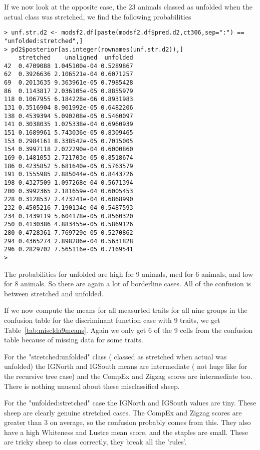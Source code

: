 \documentclass[titlepage]{article}  %
\begin{document}
If we now look at the opposite case, the 23 animals classed as unfolded when the actual class was stretched, we find the following probabilities
\begin{verbatim}
> unf.str.d2 <- modsf2.df[paste(modsf2.df$pred.d2,ct306,sep=":") == "unfolded:stretched",]
> pd2$posterior[as.integer(rownames(unf.str.d2)),]
    stretched    unaligned  unfolded
42  0.4709088 1.045100e-04 0.5289867
62  0.3926636 2.106521e-04 0.6071257
69  0.2013635 9.363961e-05 0.7985428
86  0.1143817 2.036105e-05 0.8855979
118 0.1067955 6.184228e-06 0.8931983
131 0.3516904 8.901992e-05 0.6482206
138 0.4539394 5.090208e-05 0.5460097
141 0.3038035 1.025338e-04 0.6960939
151 0.1689961 5.743036e-05 0.8309465
153 0.2984161 8.338542e-05 0.7015005
154 0.3997118 2.022290e-04 0.6000860
169 0.1481053 2.721703e-05 0.8518674
186 0.4235852 5.681640e-05 0.5763579
191 0.1555985 2.885044e-05 0.8443726
198 0.4327509 1.097268e-04 0.5671394
200 0.3992365 2.181659e-04 0.6005453
228 0.3128537 2.473241e-04 0.6868990
232 0.4505216 7.190134e-04 0.5487593
234 0.1439119 5.604178e-05 0.8560320
250 0.4130386 4.883455e-05 0.5869126
280 0.4728361 7.769729e-05 0.5270862
294 0.4365274 2.898286e-04 0.5631828
296 0.2829702 7.565116e-05 0.7169541
> 
\end{verbatim}
The probabilities for unfolded are high for 9 animals, med for 6 animals, and low for 8 animals. So there are again a lot of borderline cases. All of the confusion is between stretched and unfolded.

If we now compute the means for all measurted traits for all nine groups in the confusion table for the discriminant function case with 9 traits, we get Table~\ref{tab:misclda9means}. Again we only get 6 of the 9 cells from the confusion table because of missing data for some traits. 

For the "stretched:unfolded" class ( classed as stretched when actual was unfolded) the IGNorth and IGSouth means are intermediate ( not huge like for the recursive tree case) and the CompEx and Zigzag scores are intermediate too. There is nothing unusual about these misclassified sheep.

For the "unfolded:stretched" case the IGNorth and IGSouth values are tiny. These sheep are clearly genuine stretched cases. The CompEx and Zigzag scores are greater than 3 on average, so the confusion probably comes from this. They also have a high Whiteness and Lustre mean score, and the staples are small. These are tricky sheep to class correctly, they break all the 'rules'.
\end{document}
